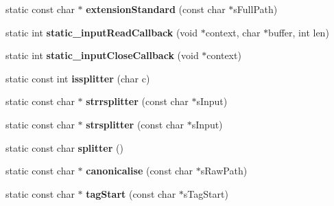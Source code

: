 \begin{DoxyCompactItemize}
\item 
\hypertarget{classgeneral__server_1_1Repository_a0f915e22c64edb73f58252f80cb86174}{static const char $\ast$ {\bfseries extension\-Standard} (const char $\ast$s\-Full\-Path)}\label{classgeneral__server_1_1Repository_a0f915e22c64edb73f58252f80cb86174}

\item 
\hypertarget{classgeneral__server_1_1Repository_a619a9a7effb95ea5694e8504a360b748}{static int {\bfseries static\-\_\-input\-Read\-Callback} (void $\ast$context, char $\ast$buffer, int len)}\label{classgeneral__server_1_1Repository_a619a9a7effb95ea5694e8504a360b748}

\item 
\hypertarget{classgeneral__server_1_1Repository_a9af6c92ed66720ed89d0aec3e3cc7e0c}{static int {\bfseries static\-\_\-input\-Close\-Callback} (void $\ast$context)}\label{classgeneral__server_1_1Repository_a9af6c92ed66720ed89d0aec3e3cc7e0c}

\item 
\hypertarget{classgeneral__server_1_1Repository_a4696104c1c3d7924e3285f1b016f17f8}{static const int {\bfseries issplitter} (char c)}\label{classgeneral__server_1_1Repository_a4696104c1c3d7924e3285f1b016f17f8}

\item 
\hypertarget{classgeneral__server_1_1Repository_a8bdf66e1b6e6754e94b7cc8084beed9f}{static const char $\ast$ {\bfseries strrsplitter} (const char $\ast$s\-Input)}\label{classgeneral__server_1_1Repository_a8bdf66e1b6e6754e94b7cc8084beed9f}

\item 
\hypertarget{classgeneral__server_1_1Repository_adbda2b36e15777bde39fc9043716d7c0}{static const char $\ast$ {\bfseries strsplitter} (const char $\ast$s\-Input)}\label{classgeneral__server_1_1Repository_adbda2b36e15777bde39fc9043716d7c0}

\item 
\hypertarget{classgeneral__server_1_1Repository_a08db70f40344119358b5313ae4c4d390}{static const char {\bfseries splitter} ()}\label{classgeneral__server_1_1Repository_a08db70f40344119358b5313ae4c4d390}

\item 
\hypertarget{classgeneral__server_1_1Repository_ad3275339ed7023c848543a643cc5f336}{static const char $\ast$ {\bfseries canonicalise} (const char $\ast$s\-Raw\-Path)}\label{classgeneral__server_1_1Repository_ad3275339ed7023c848543a643cc5f336}

\item 
\hypertarget{classgeneral__server_1_1Repository_adc0f2d2d07d5ea222acaa4e015990d5b}{static const char $\ast$ {\bfseries tag\-Start} (const char $\ast$s\-Tag\-Start)}\label{classgeneral__server_1_1Repository_adc0f2d2d07d5ea222acaa4e015990d5b}


\end{DoxyCompactItemize}
